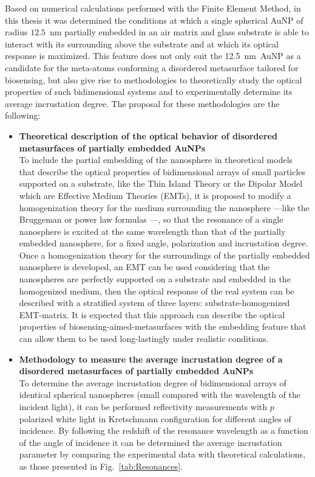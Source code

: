 
Based on numerical calculations performed with the Finite Element Method, in this thesis it was determined the conditions at which a single spherical AuNP of radius $12.5$~nm partially embedded in an air matrix and glass substrate is able to interact with its surrounding above the substrate and  at which its optical response is maximized. This feature does not only suit the 12.5~nm~AuNP as a candidate for the meta-atoms conforming a disordered metasurface tailored for biosensing, but also give rise to  methodologies to theoretically study the optical properties of such bidimensional systems and to  experimentally determine its average incrustation degree. The proposal for these methodologies are the following:

    \begin{itemize}
    \item \textbf{Theoretical description of the optical behavior of disordered metasurfaces of partially embedded AuNPs}\\
    To include the partial embedding of the nanosphere in theoretical models that describe the optical properties of bidimensional arrays of small particles supported on a substrate, like the Thin Island Theory \cite{bedeaux_optical_2004} or the Dipolar Model \cite{barrera1991optical} which are Effective Medium Theories (EMTs), it is proposed to modify a homogenization theory for the medium surrounding the nanosphere ---like the Bruggeman or power law formulas \cite{sihvola_electromagnetic_2008}---, so that the resonance of a single nanosphere is excited at the same wavelength than that of the partially embedded nanosphere, for a fixed angle, polarization and incrustation degree.  Once a homogenization theory for the surroundings of the partially embedded nanosphere is developed, an EMT can be used considering that the nanospheres are perfectly supported on a substrate and embedded in the homogenized medium, then the optical response of the real system can be described with a stratified system of three layers: substrate-homogenized EMT-matrix. It is expected that this approach can describe the optical properties of biosensing-aimed-metasurfaces with the embedding feature that can allow them to be used long-lastingly under realistic conditions.
    \item \textbf{Methodology to measure the average incrustation degree of a disordered metasurfaces of partially embedded AuNPs}\\
    To determine the average incrustation degree of bidimensional arrays of identical spherical nanospheres (small compared with the wavelength of the incident light), it can be performed reflectivity measurements with $p$ polarized white light in Kretschmann configuration for different angles of incidence. By following the redshift of the resonance wavelength as a function of the angle of incidence it can be determined the average incrustation parameter by comparing the experimental data with theoretical calculations, as those presented in Fig.~\ref{tab:Resonances}.
    \end{itemize}
